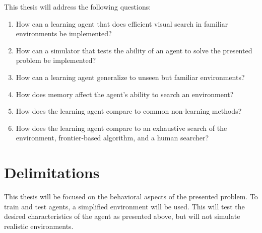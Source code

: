 This thesis will address the following questions:

\begin{enumerate}
  \item How can a learning agent that does efficient visual search in familiar environments be implemented?
  \item How can a simulator that tests the ability of an agent to solve the presented problem be implemented?
  \item How can a learning agent generalize to unseen but familiar environments?
  \item How does memory affect the agent's ability to search an environment?
  \item How does the learning agent compare to common non-learning methods?
  \item How does the learning agent compare to an exhaustive search of the environment, frontier-based algorithm, and a human searcher?
\end{enumerate}


\section{Delimitations}
\label{sec:delimitations}

This thesis will be focused on the behavioral aspects of the presented problem. To train and test agents, a simplified environment will be used. This will test the desired characteristics of the agent as presented above, but will not simulate realistic environments.




